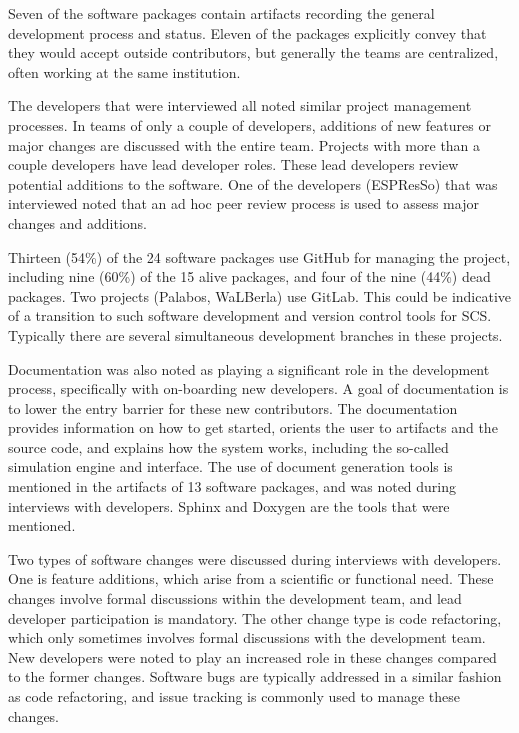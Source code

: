 \documentclass[final, 3p, times, authoryear]{elsarticle}
\begin{document}
Seven of the software packages contain artifacts recording the general
development process and status. Eleven of the packages explicitly convey that
they would accept outside contributors, but generally the teams are centralized,
often working at the same institution. 

The developers that were interviewed all noted similar project management
processes. In teams of only a couple of developers, additions of new features or
major changes are discussed with the entire team. Projects with more than a
couple developers have lead developer roles. These lead developers review
potential additions to the software. One of the developers (ESPResSo) that was
interviewed noted that an ad hoc peer review process is used to assess major
changes and additions.

Thirteen (54\%) of the 24 software packages use GitHub for managing the project,
including nine (60\%) of the 15 alive packages, and four of the nine (44\%) dead
packages. Two projects (Palabos, WaLBerla) use GitLab. This could be indicative
of a transition to such software development and version control tools for SCS.
Typically there are several simultaneous development branches in these projects.

Documentation was also noted as playing a significant role in the development
process, specifically with on-boarding new developers. A goal of documentation
is to lower the entry barrier for these new contributors. The documentation
provides information on how to get started, orients the user to artifacts and
the source code, and explains how the system works, including the so-called
simulation engine and interface. The use of document generation tools is
mentioned in the artifacts of 13 software packages, and was noted during
interviews with developers. Sphinx and Doxygen are the tools that were
mentioned. 

Two types of software changes were discussed during interviews with developers.
One is feature additions, which arise from a scientific or functional need.
These changes involve formal discussions within the development team, and lead
developer participation is mandatory. The other change type is code refactoring,
which only sometimes involves formal discussions with the development team. New
developers were noted to play an increased role in these changes compared to the
former changes. Software bugs are typically addressed in a similar fashion as
code refactoring, and issue tracking is commonly used to manage these changes. 
\end{document}
